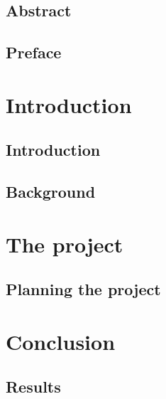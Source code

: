 \documentclass[UKenglish]{ifimaster}
\title{\problemStatement}
\subtitle{
}
\author{Joakim I. Frogner}
\begin{document}
\duoforside[dept={Department of Informatics},
program={Programming and Networks},
long]

\frontmatter{}
\chapter*{Abstract}

\tableofcontents{} 
\listoffigures{}
\listoftables{}

\chapter*{Preface}

\mainmatter{}
\part{Introduction}

\chapter{Introduction}


\chapter{Background}



\part{The project}
\chapter{Planning the project}


\part{Conclusion}
 
\chapter{Results} 



\backmatter{}
\printbibliography
\end{document}
